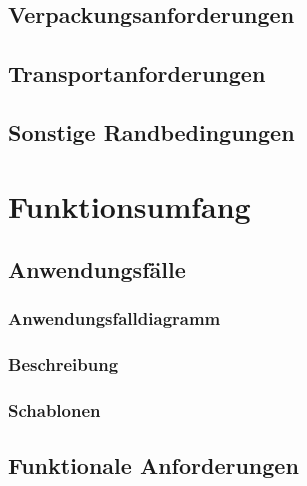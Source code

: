 \subsection{Verpackungsanforderungen}


\subsection{Transportanforderungen}


\subsection{Sonstige Randbedingungen}



\section{Funktionsumfang}

\subsection{Anwendungsfälle}

\subsubsection{Anwendungsfalldiagramm}


\subsubsection{Beschreibung}










\subsubsection{Schablonen}


\subsection{Funktionale Anforderungen}
\label{subsec:funktionale_anforderungen}


